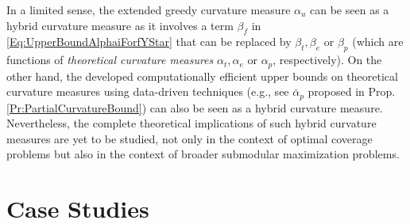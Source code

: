 \documentclass[letterpaper, 10 pt, conference]{ieeeconf}
\begin{document}
In a limited sense, the extended greedy curvature measure $\alpha_u$ can be seen as a hybrid curvature measure as it involves a term $\beta_f$ in \eqref{Eq:UpperBoundAlphaiForfYStar} that can be replaced by $\beta_t,\beta_e$ or $\beta_p$ (which are functions of \emph{theoretical curvature measures} $\alpha_t,\alpha_e$ or $\alpha_p$, respectively). On the other hand, the developed computationally efficient upper bounds on theoretical curvature measures using data-driven techniques (e.g., see $\bar{\alpha}_p$ proposed in Prop. \ref{Pr:PartialCurvatureBound}) can also be seen as a hybrid curvature measure. Nevertheless, the complete theoretical implications of such hybrid curvature measures are yet to be studied, not only in the context of optimal coverage problems but also in the context of broader submodular maximization problems.      



 

\section{Case Studies}
\label{Sec:CaseStudies}
\end{document}
